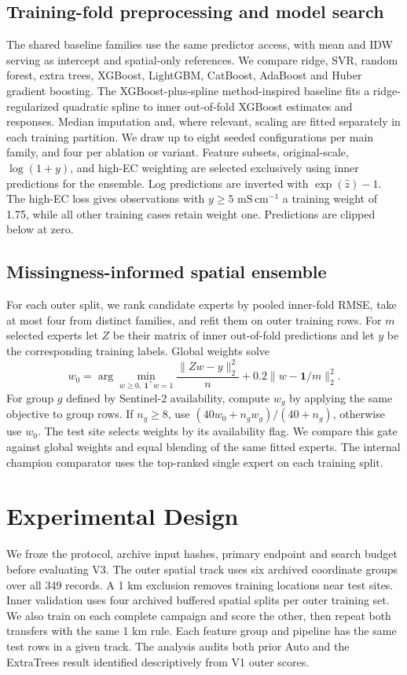 \documentclass[conference]{IEEEtran}
\newcommand{\unit}{\ensuremath{\mathrm{mS\,cm^{-1}}}}
\begin{document}
\subsection{Training-fold preprocessing and model search}
The shared baseline families use the same predictor access, with mean and IDW serving as intercept and spatial-only references. We compare ridge, SVR, random forest, extra trees, XGBoost, LightGBM, CatBoost, AdaBoost and Huber gradient boosting. The XGBoost-plus-spline method-inspired baseline fits a ridge-regularized quadratic spline to inner out-of-fold XGBoost estimates and responses. Median imputation and, where relevant, scaling are fitted separately in each training partition. We draw up to eight seeded configurations per main family, and four per ablation or variant. Feature subsets, original-scale, $\log(1+y)$, and high-EC weighting are selected exclusively using inner predictions for the ensemble. Log predictions are inverted with $\exp(\widehat z)-1$. The high-EC loss gives observations with $y\geq 5$ \unit{} a training weight of 1.75, while all other training cases retain weight one. Predictions are clipped below at zero.

\subsection{Missingness-informed spatial ensemble}
For each outer split, we rank candidate experts by pooled inner-fold RMSE, take at most four from distinct families, and refit them on outer training rows. For $m$ selected experts let $Z$ be their matrix of inner out-of-fold predictions and let $y$ be the corresponding training labels. Global weights solve
\begin{equation}
w_0=\arg\min_{w\geq0,\ \mathbf{1}^{\top}w=1}
    \frac{\lVert Zw-y\rVert_2^2}{n}+0.2\lVert w-\mathbf{1}/m\rVert_2^2 .
\end{equation}
For group $g$ defined by Sentinel-2 availability, compute $w_g$ by applying the same objective to group rows. If $n_g\geq8$, use $(40w_0+n_gw_g)/(40+n_g)$, otherwise use $w_0$. The test site selects weights by its availability flag. We compare this gate against global weights and equal blending of the same fitted experts. The internal champion comparator uses the top-ranked single expert on each training split.

\section{Experimental Design}
We froze the protocol, archive input hashes, primary endpoint and search budget before evaluating V3. The outer spatial track uses six archived coordinate groups over all 349 records. A 1 km exclusion removes training locations near test sites. Inner validation uses four archived buffered spatial splits per outer training set. We also train on each complete campaign and score the other, then repeat both transfers with the same 1 km rule. Each feature group and pipeline has the same test rows in a given track. The analysis audits both prior Auto and the ExtraTrees result identified descriptively from V1 outer scores.
\end{document}
